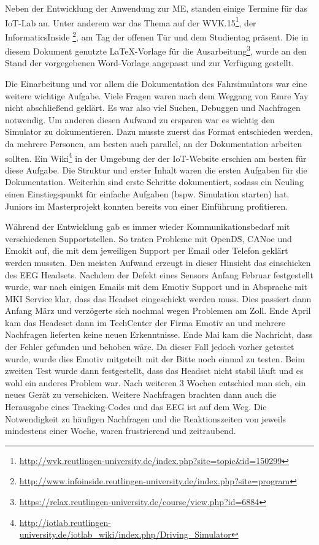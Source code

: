 \label{chap:master_project}
Neben der Entwicklung der Anwendung zur \acl{ME}, standen einige Termine für das IoT-Lab an. Unter anderem war das Thema auf der WVK.15\footnote{\url{http://wvk.reutlingen-university.de/index.php?site=topic&id=150299}}, der InformaticsInside \footnote{\url{http://www.infoinside.reutlingen-university.de/index.php?site=program}}, am Tag der offenen Tür und dem Studientag präsent. 
Die in diesem Dokument genutzte \LaTeX -Vorlage für die Ausarbeitung\footnote{\url{https://relax.reutlingen-university.de/course/view.php?id=6884}}, wurde an den Stand der vorgegebenen Word-Vorlage angepasst und zur Verfügung gestellt.

Die Einarbeitung und vor allem die Dokumentation des Fahrsimulators war eine weitere wichtige Aufgabe. Viele Fragen waren nach dem Weggang von Emre Yay nicht abschließend geklärt. Es war also viel Suchen, Debuggen und Nachfragen notwendig. Um anderen diesen Aufwand zu ersparen war es wichtig den Simulator zu dokumentieren. Dazu musste zuerst das Format entschieden werden, da mehrere Personen, am besten auch parallel, an der Dokumentation arbeiten sollten. Ein Wiki\footnote{\url{http://iotlab.reutlingen-university.de/iotlab_wiki/index.php/Driving_Simulator}} in der Umgebung der der IoT-Website erschien am besten für diese Aufgabe. Die Struktur und erster Inhalt waren die ersten Aufgaben für die Dokumentation. Weiterhin sind erste Schritte dokumentiert, sodass ein Neuling einen Einstiegspunkt für einfache Aufgaben (bspw. Simulation starten) hat. Juniors im Masterprojekt konnten bereits von einer Einführung profitieren.

Während der Entwicklung gab es immer wieder Kommunikationsbedarf mit verschiedenen Supportstellen. So traten Probleme mit OpenDS, CANoe und Emokit auf, die mit dem jeweiligen Support per Email oder Telefon geklärt werden mussten. Den meisten Aufwand erzeugt in dieser Hinsicht das einschicken des EEG Headsets. Nachdem der Defekt eines Sensors Anfang Februar festgestellt wurde, war nach einigen Emails mit dem Emotiv Support und in Absprache mit MKI Service klar, dass das Headset eingeschickt werden muss. Dies passiert dann Anfang März und verzögerte sich nochmal wegen Problemen am Zoll. Ende April kam das Headeset dann im TechCenter der Firma Emotiv an und mehrere Nachfragen lieferten keine neuen Erkenntnisse. Ende Mai kam die Nachricht, dass der Fehler gefunden und behoben wäre. Da dieser Fall jedoch vorher getestet wurde, wurde dies Emotiv mitgeteilt mit der Bitte noch einmal zu testen. Beim zweiten Test wurde dann festgestellt, dass das Headset nicht stabil läuft und es wohl ein anderes Problem war. Nach weiteren 3 Wochen entschied man sich, ein neues Gerät zu verschicken. Weitere Nachfragen brachten dann auch die Herausgabe eines Tracking-Codes und das EEG ist auf dem Weg. Die Notwendigkeit zu häufigen Nachfragen und die Reaktionszeiten von jeweils mindestens einer Woche, waren frustrierend und zeitraubend.

